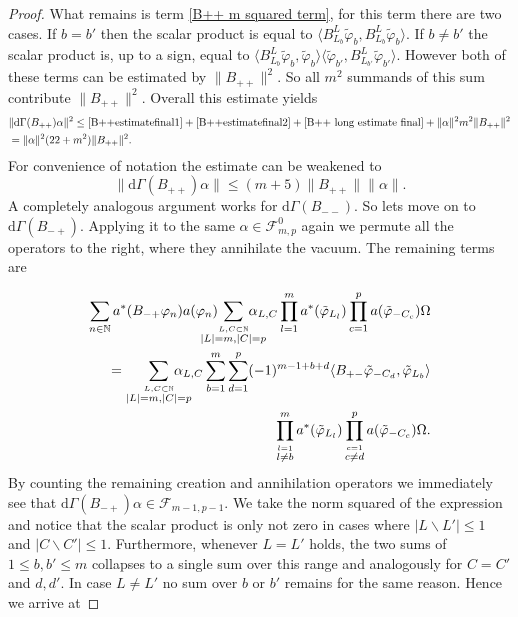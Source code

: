 \documentclass[b5paper,draft,openbib,12pt]{memoir}
\begin{document}
\begin{proof}
What remains is term \eqref{B++ m squared term}, for this term there are two cases.  If \(b=b'\) then the scalar product is 
equal to \(\langle B_{L_b}^L \tilde{\varphi}_b, B_{L_{b}}^L \tilde{\varphi}_{b}\rangle\). If \(b\neq b'\) the scalar product is, up to a sign,
equal to \(\langle B_{L_b}^L \tilde{\varphi}_b,\tilde{\varphi}_{b}\rangle \langle \tilde{\varphi}_{b'}, B_{L_{b'}}^L \tilde{\varphi}_{b'}\rangle\).
However both of these terms can be estimated by \(\|B_{++}\|^2\). So all \(m^2\) summands of this sum contribute \(\|B_{++}\|^2\). Overall 
this estimate yields
\begin{align}\nonumber
&\|\mathrm{d}\Gamma(B_{++})\alpha\|^2 \le \eqref{B++estimatefinal1}+\eqref{B++estimatefinal2}+\eqref{B++ long estimate final} + \|\alpha\|^2 m^2 \|B_{++}\|^2 \\\nonumber
&= \|\alpha\|^2 (22+m^2) \|B_{++}\|^2.
\end{align}
For convenience of notation the estimate can be weakened to 
\begin{equation}
\|\mathrm{d}\Gamma(B_{++})\alpha\| \le (m+5) \|B_{++}\|\|\alpha\|.
\end{equation}
A completely analogous argument works for 
\(\mathrm{d}\Gamma(B_{--})\). 
So lets move on to \(\mathrm{d}\Gamma(B_{-+})\). Applying it 
to the same \(\alpha\in \mathcal{F}^0_{m,p}\) again we 
permute all the operators
to the right, where they annihilate the vacuum. The remaining 
terms are

\begin{align}\nonumber
\sum_{n\in\mathbb{N}} a^*(B_{-+}\varphi_n)a(\varphi_{n})\hspace{-0.5cm}\sum_{\overset{L,C\subset \mathbb{N}}{|L|=m,|C|=p}}  \hspace{-0.5cm}\alpha_{L,C} 
\prod_{l=1}^m a^*(\tilde{\varphi}_{L_l}) \prod_{c=1}^p a(\tilde{\varphi}_{-C_c}) \Omega  \\\nonumber
=\sum_{\overset{L,C\subset \mathbb{N}}{|L|=m,|C|=p}}\hspace{-0.5cm} \alpha_{L,C} \sum_{b=1}^m \sum_{d=1}^p (-1)^{m-1+b+d} \langle B_{+-} \tilde{\varphi}_{-C_d},\tilde{\varphi}_{L_b}\rangle \\
\prod_{\overset{l=1}{l\neq b}}^m a^*(\tilde{\varphi}_{L_l})
\prod_{\overset{c=1}{c\neq d}}^p a(\tilde{\varphi}_{-C_c})\Omega.
\end{align}
By counting the remaining creation and annihilation operators 
we immediately see that \(\mathrm{d}\Gamma(B_{-+})\alpha\in 
\mathcal{F}_{m-1,p-1}\). We take the norm squared of the 
expression and notice that the scalar product is only 
not zero in cases where \(|L\backslash L'|\le 1\) and 
\(|C\backslash C'|\le 1\). Furthermore, whenever 
\(L = L'\) holds, the two sums of \(1\le b,b'\le m\)
collapses to a single sum over this range and analogously
for \(C = C'\) and \(d,d'\). In case \(L \neq L'\)
no sum over \(b\) or \(b'\) remains for the same reason.
Hence we arrive at



\end{proof}
\end{document}

